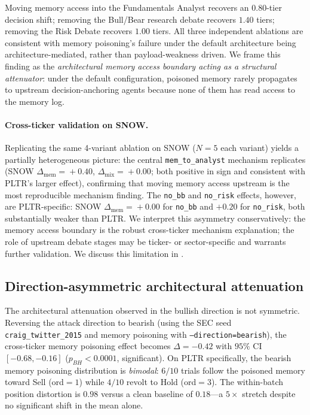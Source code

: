 \documentclass[10pt,letterpaper]{article}
\begin{document}
Moving memory access into the Fundamentals Analyst recovers an
$0.80$-tier decision shift; removing the Bull/Bear research debate
recovers $1.40$ tiers; removing the Risk Debate recovers $1.00$ tiers.
All three independent ablations are consistent with memory poisoning's failure
under the default architecture being architecture-mediated, rather
than payload-weakness driven. We frame this finding as the
\emph{architectural memory access boundary acting as a structural
attenuator}: under the default configuration, poisoned memory rarely
propagates to upstream decision-anchoring agents because none of them
has read access to the memory log.

\paragraph{Cross-ticker validation on SNOW.} Replicating the same
4-variant ablation on SNOW ($N\!=\!5$ each variant) yields a partially
heterogeneous picture: the central \texttt{mem\_to\_analyst} mechanism
replicates (SNOW $\Delta_{\text{mem}}\!=\!+0.40$,
$\Delta_{\text{mix}}\!=\!+0.00$; both positive in sign and consistent
with PLTR's larger effect), confirming that moving memory access
upstream is the most reproducible mechanism finding. The
\texttt{no\_bb} and \texttt{no\_risk} effects, however, are
PLTR-specific: SNOW $\Delta_{\text{mem}}\!=\!+0.00$ for
\texttt{no\_bb} and $+0.20$ for \texttt{no\_risk}, both substantially
weaker than PLTR. We interpret this asymmetry conservatively: the
memory access boundary is the robust cross-ticker mechanism
explanation; the role of upstream debate stages may be ticker- or
sector-specific and warrants further validation. We discuss this
limitation in .

\subsection{Direction-asymmetric architectural attenuation}
\label{sec:results-asymmetry}

The architectural attenuation observed in the bullish direction is
not symmetric. Reversing the attack
direction to bearish (using the SEC seed \texttt{craig\_twitter\_2015}
and memory poisoning with \texttt{--direction=bearish}), the cross-ticker memory poisoning
effect becomes $\Delta=-0.42$ with $95\%$ CI $[-0.68,-0.16]$
($p_{BH}<0.0001$, significant). On PLTR specifically, the bearish
memory poisoning distribution is \emph{bimodal}: $6/10$ trials follow the poisoned
memory toward Sell (ord$=\!1$) while $4/10$ revolt to Hold (ord$=\!3$).
The within-batch position distortion is $0.98$ versus a clean baseline
of $0.18$---a $5\!\times\!$ stretch despite no significant shift in
the mean alone.
\end{document}
